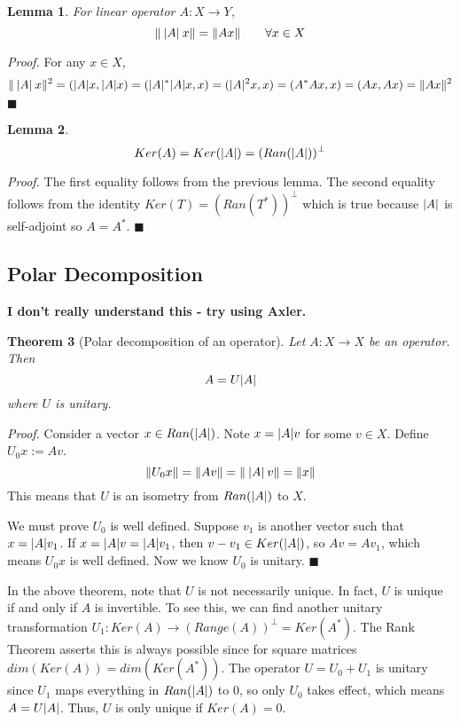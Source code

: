 \documentclass[a4paper,10pt]{book}
\theoremstyle{plain}
\newtheorem{theorem}{Theorem}[section]
\renewenvironment{proof}{\textsl{Proof.}}{\hfill$\blacksquare$}
\theoremstyle{plain}
\newtheorem{lemma}[theorem]{Lemma}
\newenvironment{lproof}{\textsl{Proof.}}{\hfill$\blacksquare$}
\theoremstyle{definition}
\begin{document}
\begin{lemma}
For linear operator $A: X \rightarrow Y$, 
$$\lVert\: \lvert A\rvert \: x\rVert = \lVert Ax\rVert \qquad \forall x \in X$$ 
\end{lemma}

\begin{lproof}
For any $x \in X$, 
$$\lVert\: \lvert A\rvert \: x\rVert^{2} = (\lvert A\rvert x, \lvert A\rvert x) = (\lvert A\rvert^{*} \lvert A\rvert x, x) = (\lvert A\rvert^{2} x, x) = (A^{*} A x, x) = (Ax, Ax) = \lVert Ax\rVert^{2}$$
\end{lproof}

\begin{lemma}
$$Ker(A) = Ker(\lvert A\rvert) = (Ran(\lvert A\rvert))^{\perp}$$
\end{lemma}

\begin{lproof}
The first equality follows from the previous lemma. The second equality follows from the identity $Ker(T) = (Ran(T^{*}))^{\perp}$ which is true because $\lvert A\rvert$ is self-adjoint so $A = A^{*}$. 
\end{lproof}

\subsection{Polar Decomposition}

\textbf{I don't really understand this - try using Axler.}
\begin{theorem}[Polar decomposition of an operator]
Let $A: X \rightarrow X$ be an operator. Then 
$$A = U \lvert A\rvert$$
where $U$ is unitary. 
\end{theorem}

\begin{proof}
Consider a vector $x \in Ran(\lvert A\rvert)$. Note $x = \lvert A\rvert v$ for some $v \in X$. Define $U_{0} x := Av$. 
$$\lVert U_{0} x\rVert = \lVert Av\rVert = \lVert \: \lvert A\rvert \: v\rVert = \lVert x\rVert$$
This means that $U$ is an isometry from $Ran(\lvert A\rvert)$ to $X$. 

We must prove $U_{0}$ is well defined. Suppose $v_{1}$ is another vector such that $x = \lvert A\rvert v_{1}$. If $x = \lvert A\rvert v = \lvert A\rvert v_{1}$, then $v - v_{1} \in Ker(\lvert A\rvert)$, so $Av = Av_{1}$, which means $U_{0} x$ is well defined. Now we know $U_{0}$ is unitary. 
\end{proof}

In the above theorem, note that $U$ is not necessarily unique. In fact, $U$ is unique if and only if $A$ is invertible. To see this, we can find another unitary transformation $U_{1}: Ker(A) \rightarrow (Range(A))^{\perp} = Ker(A^{*})$. The Rank Theorem asserts this is always possible since for square matrices $dim(Ker(A)) = dim(Ker(A^{*}))$. The operator $U = U_{0} + U_{1}$ is unitary since $U_{1}$ maps everything in $Ran(\lvert A\rvert)$ to 0, so only $U_{0}$ takes effect, which means $A = U \lvert A\rvert$. Thus, $U$ is only unique if $Ker(A) = 0$. 
\end{document}
